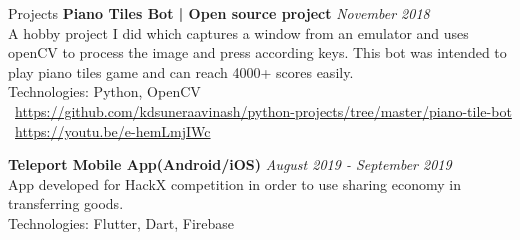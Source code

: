 \documentclass{cv}
\begin{document}
\begin{rSection}{Projects}
    {\bf Piano Tiles Bot | Open source project}                   \hfill {\em November 2018}
    \\A hobby project I did which captures a window from an emulator and uses openCV to process the image and press according keys. This bot was intended to play piano tiles game and can reach 4000+ scores easily.\\
    Technologies: Python, OpenCV\\
    \faGithub*\ \url{https://github.com/kdsuneraavinash/python-projects/tree/master/piano-tile-bot}\\
    \faYoutube\ \url{https://youtu.be/e-hemLmjIWc} \par

    {\bf Teleport Mobile App(Android/iOS)}                        \hfill {\em August 2019 - September 2019}
    \\App developed for HackX competition in order to use sharing economy in transferring goods. \\
    Technologies: Flutter, Dart, Firebase \par
\end{rSection}


\end{document}
